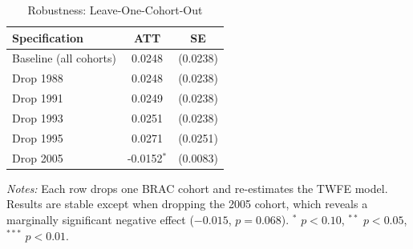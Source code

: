 \begin{table}[!t]
\centering
\caption{Robustness: Leave-One-Cohort-Out}
\label{tab:loco}
\begin{tabular}{lcc}
\hline\hline
Specification & ATT & SE \\
\hline
Baseline (all cohorts) & 0.0248 & (0.0238) \\
[3pt]
Drop 1988 & 0.0248 & (0.0238) \\
Drop 1991 & 0.0249 & (0.0238) \\
Drop 1993 & 0.0251 & (0.0238) \\
Drop 1995 & 0.0271 & (0.0251) \\
Drop 2005 & -0.0152$^{*}$ & (0.0083) \\
\hline\hline
\end{tabular}
\begin{tablenotes}[flushleft]\small
\item \textit{Notes:} Each row drops one BRAC cohort and re-estimates the TWFE model. Results are stable except when dropping the 2005 cohort, which reveals a marginally significant negative effect ($-0.015$, $p=0.068$). $^{*}$ $p<0.10$, $^{**}$ $p<0.05$, $^{***}$ $p<0.01$.
\end{tablenotes}
\end{table}

